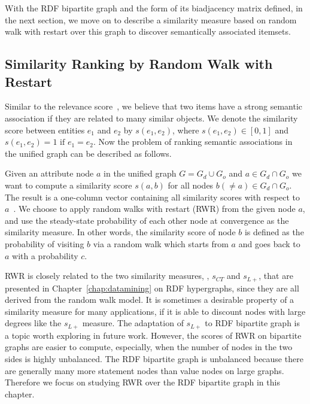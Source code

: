 
With the RDF bipartite graph and the form of its biadjacency matrix defined, in the next section, we move on to describe a similarity measure based on random walk with restart over this graph to discover semantically associated itemsets.


\subsection{Similarity Ranking by Random Walk with Restart}

Similar to the relevance score~\cite{SunEtal05}, we believe that two items have a strong semantic association if they are related to many similar objects. We denote the similarity score between entities $e_1$ and $e_2$ by $s(e_1, e_2)$, where $s(e_1,e_2) \in [0, 1]$ and $s(e_1, e_2) = 1 \text{ if } e_1 = e_2$. Now the problem of ranking semantic associations in the unified graph can be described as follows.

Given an attribute node $a$ in the unified graph $G = G_d \cup G_o$ and $a \in G_d \cap G_o$ we want to compute a similarity score $s(a, b)$ for all nodes $b(\neq a) \in G_d \cap G_o$. The result is a one-column vector containing all similarity scores with respect to $a$~\cite{Chen_tuplerank:ranking}. We choose to apply random walks with restart (RWR) from the given node $a$, and use the steady-state probability of each other node at convergence as the similarity measure. In other words, the similarity score of node $b$ is defined as the probability of visiting $b$ via a random walk which starts from $a$ and goes back to $a$ with a probability $c$.

RWR is closely related to the two similarity measures, \ie, $s_{CT}$ and $s_{L+}$, that are presented in Chapter~\ref{chap:datamining} on RDF hypergraphs, since they are all derived from the random walk model. It is sometimes a desirable property of a similarity measure for many applications, if it is able to discount nodes with large degrees like the $s_{L+}$ measure. The adaptation of $s_{L+}$ to RDF bipartite graph is a topic worth exploring in future work. However, the scores of RWR on bipartite graphs are easier to compute, especially, when the number of nodes in the two sides is highly unbalanced. The RDF bipartite graph is unbalanced because there are generally many more statement nodes than value nodes on large graphs. Therefore we focus on studying RWR over the RDF bipartite graph in this chapter.

